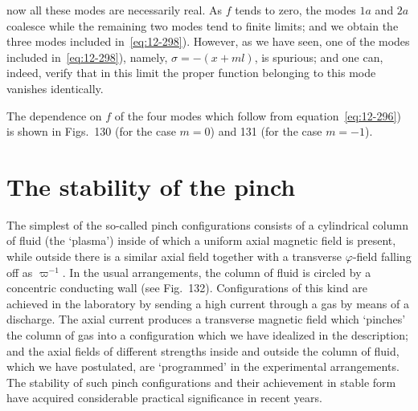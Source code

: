 

now all these modes are necessarily real. As $f$ tends to zero, the modes $1a$ and $2a$ coalesce while the remaining two modes tend to finite limits; and we obtain the three modes included in~\eqref{eq:12-298}). However, as we have seen, one of the modes included in~\eqref{eq:12-298}), namely, $\sigma = -(x+ml)$, is spurious; and one can, indeed, verify that in this limit the proper function belonging to this mode vanishes identically.

The dependence on $f$ of the four modes which follow from equation~\eqref{eq:12-296}) is shown in Figs.~130 (for the case $m = 0$) and 131 (for the case $m = -1$).

\section{The stability of the pinch}\label{sec:115}
The simplest of the so-called pinch configurations consists of a cylindrical column of fluid (the `plasma') inside of which a uniform axial magnetic field is present, while outside there is a similar axial field together with a transverse $\varphi$-field falling off as $\varpi^{-1}$. In the usual arrangements, the column of fluid is circled by a concentric conducting wall (see Fig.~132). Configurations of this kind are achieved in the laboratory by sending a high current through a gas by means of a discharge. The axial current produces a transverse magnetic field which `pinches' the column of gas into a configuration which we have idealized in the description; and the axial fields of different strengths inside and outside the column of fluid, which we have postulated, are `programmed' in the experimental arrangements. The stability of such pinch configurations and their achievement in stable form have acquired considerable practical significance in recent years.

